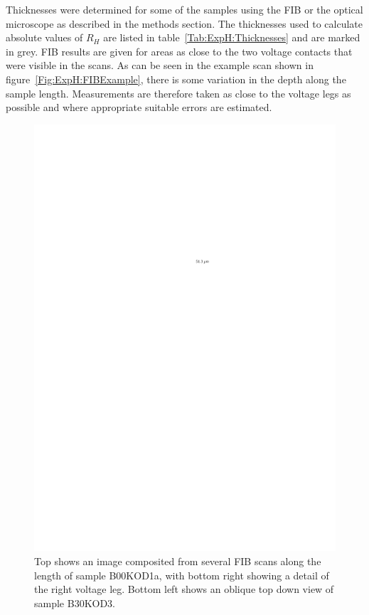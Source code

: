 Thicknesses were determined for some of the samples using the \ac{FIB} or the optical microscope as described in the methods section. The thicknesses used to calculate absolute values of $R_H$ are listed in table~\ref{Tab:ExpH:Thicknesses} and are marked in grey. \ac{FIB} results are given for areas as close to the two voltage contacts that were visible in the scans. As can be seen in the example scan shown in figure~\ref{Fig:ExpH:FIBExample}, there is some variation in the depth along the sample length. Measurements are therefore taken as close to the voltage legs as possible and where appropriate suitable errors are estimated.
\begin{figure}[htbp]
	\begin{center}
		\includegraphics[scale=0.9]{Chapter-HallBSCO/Figures/FIBExamples/FIBExamples}
		\caption{Top shows an image composited from several \ac{FIB} scans along the length of sample B00KOD1a, with bottom right showing a detail of the right voltage leg. Bottom left shows an oblique top down view of sample B30KOD3.}
		\label{Fig:ExpH:FIBExamples}
	\end{center}
\end{figure}

